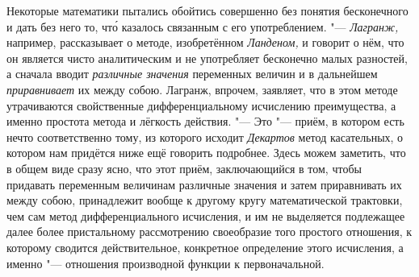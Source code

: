 Некоторые математики пытались обойтись совершенно без понятия бесконечного и
дать без него то, чт\'{о} казалось связанным с его употреблением. "---
{\em Лагранж,} например, рассказывает о методе, изобретённом {\em Ланденом,} и
говорит о нём, что он является чисто аналитическим и не употребляет бесконечно
малых разностей, а сначала вводит {\em различные значения} переменных величин и
в дальнейшем {\em приравнивает} их между собою. Лагранж, впрочем, заявляет, что
в этом методе утрачиваются свойственные дифференциальному исчислению
преимущества, а именно простота метода и лёгкость действия. "--- Это "---
приём, в котором есть нечто соответственно тому, из которого исходит
{\em Декартов} метод касательных, о котором нам придётся ниже ещё говорить
подробнее. Здесь можем заметить, что в общем виде сразу ясно, что этот приём,
заключающийся в том, чтобы придавать переменным величинам различные значения и
затем приравнивать их между собою, принадлежит вообще к другому кругу
математической трактовки, чем сам метод дифференциального исчисления, и им не
выделяется подлежащее далее более пристальному рассмотрению своеобразие того
простого отношения, к которому сводится действительное, конкретное определение
этого исчисления, а именно "--- отношения производной функции к первоначальной.


